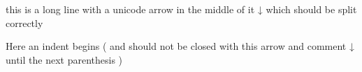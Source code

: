 \documentclass{article}
\begin{document}
this is a long line with a unicode arrow in the middle of it ↓ which
should be split correctly

Here an indent begins (
  and should not be closed with this arrow and comment ↓%
  until the next parenthesis
)
\end{document}
